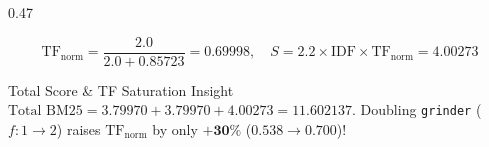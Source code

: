 \documentclass[aspectratio=169]{beamer}
\begin{document}
\begin{frame}[fragile]
\begin{columns}[T]
\begin{column}{0.47\textwidth}
\begin{itemize}
\[    \]
    \vspace{-0.22cm}
    \[
    \text{TF}_{\text{norm}} = \frac{2.0}{2.0 + 0.85723} = 0.69998, \quad S = 2.2 \times \text{IDF} \times \text{TF}_{\text{norm}} = \mathbf{4.00273}
    \]
\end{itemize}
\vspace{-0.12cm}
\begin{block}{\tiny Total Score \& TF Saturation Insight}
\tiny
$\text{Total BM25} = 3.79970 + 3.79970 + 4.00273 = \mathbf{11.602137}$. Doubling \texttt{grinder} ($f: 1 \rightarrow 2$) raises $\text{TF}_{\text{norm}}$ by only $\mathbf{+30\%}$ ($0.538 \rightarrow 0.700$)!
\end{block}
\end{column}
\end{columns}
\end{frame}
\end{document}
